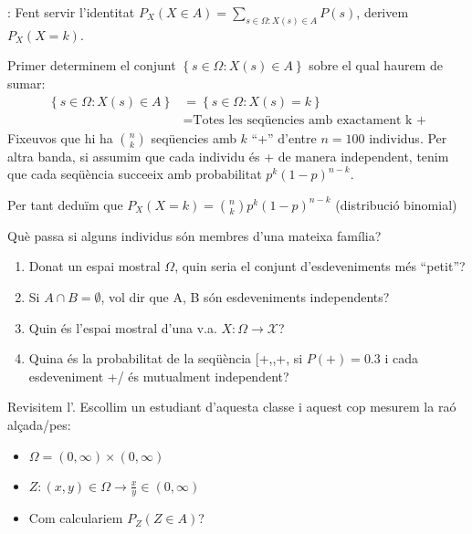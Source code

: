 \documentclass[letterpaper,10pt,english]{sphinxmanual}
\begin{document}
: Fent servir l’identitat \(P_X\left(X \in A\right) = \sum_{s\in \Omega: X\left(s\right) \in A } P\left(s\right)\), derivem \(P_X\left(X=k\right)\).

Primer determinem el conjunt \(\left\{s\in \Omega: X\left(s\right) \in A\right\}\) sobre el qual haurem de sumar:
\begin{equation*}
\begin{split}\left\{s\in \Omega: X\left(s\right) \in A\right\} &= \left\{s\in \Omega: X\left(s\right)= k\right\}\\
&= \mbox{Totes les seqüencies amb exactament k +}\end{split}
\end{equation*}
Fixeu\sphinxhyphen{}vos que hi ha \({n \choose k}\) seqüencies amb \(k\) “+” d’entre \(n=100\) individus. Per altra banda,
si assumim que cada individu és + de manera independent, tenim que cada seqüència
succeeix amb probabilitat \(p^k\left(1-p\right)^{n-k}\).

Per tant deduïm que \(P_X\left(X=k\right) = {n \choose k}p^k\left(1-p\right)^{n-k}\) (distribució binomial)

Què passa si alguns individus són membres d’una mateixa família?
\begin{enumerate}
%
\item {} 
Donat un espai mostral \(\Omega\), quin seria el conjunt d’esdeveniments més “petit”?

\item {} 
Si \(A \cap B = \emptyset\), vol dir que A, B són esdeveniments independents?

\item {} 
Quin és l’espai mostral d’una v.a. \(X: \Omega \to \mathcal{X}\)?

\item {} 
Quina és la probabilitat de la seqüència {[}+,\sphinxhyphen{},+,\sphinxhyphen{}{]} si \(P\left(+\right)=0.3\) i cada esdeveniment +/\sphinxhyphen{} és mutualment independent?

\end{enumerate}

Revisitem l’. Escollim un estudiant d’aquesta classe i aquest cop mesurem la raó alçada/pes:
\begin{itemize}
\item {} 
\(\Omega = \left(0, \infty \right) \times \left(0, \infty \right)\)

\item {} 
\(Z: (x, y) \in \Omega \to \frac{x}{y} \in \left(0, \infty \right)\)

\item {} 
Com calculariem \(P_Z\left(Z \in A\right)\)? 

\end{itemize}
\end{document}
